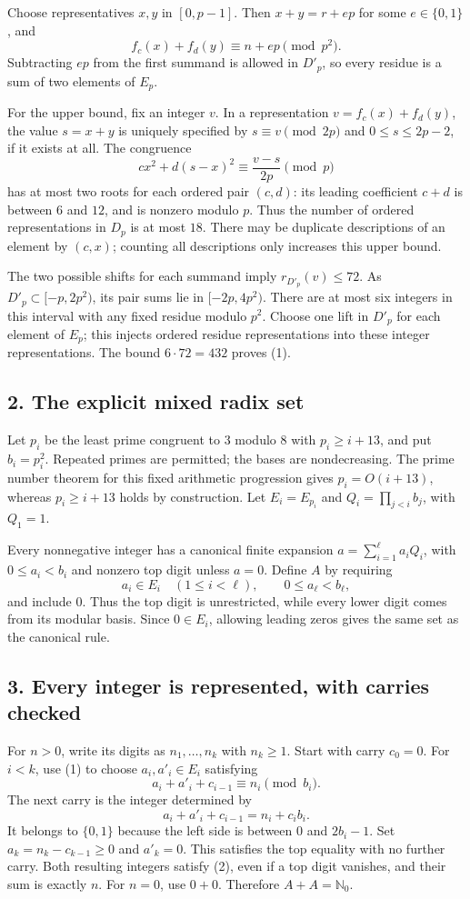 Choose representatives $x,y$ in $[0,p-1]$. Then $x+y=r+ep$ for some
$e\in\{0,1\}$, and
\[
 f_c(x)+f_d(y)\equiv n+ep\pmod{p^2}.
\]
Subtracting $ep$ from the first summand is allowed in $D'_p$, so every
residue is a sum of two elements of $E_p$.

For the upper bound, fix an integer $v$. In a representation
$v=f_c(x)+f_d(y)$, the value $s=x+y$ is uniquely specified by
$s\equiv v\pmod{2p}$ and $0\leq s\leq2p-2$, if it exists at all.
The congruence
\[
 cx^2+d(s-x)^2\equiv\frac{v-s}{2p}\pmod p
\]
has at most two roots for each ordered pair $(c,d)$: its leading
coefficient $c+d$ is between $6$ and $12$, and is nonzero modulo $p$.
Thus the number of ordered representations in $D_p$ is at most $18$.
There may be duplicate descriptions of an element by $(c,x)$; counting
all descriptions only increases this upper bound.

The two possible shifts for each summand imply $r_{D'_p}(v)\leq72$.
As $D'_p\subset[-p,2p^2)$, its pair sums lie in $[-2p,4p^2)$.
There are at most six integers in this interval with any fixed residue
modulo $p^2$. Choose one lift in $D'_p$ for each element of $E_p$;
this injects ordered residue representations into these integer
representations. The bound $6\cdot72=432$ proves (1).

\subsection{2. The explicit mixed radix set}
Let $p_i$ be the least prime congruent to $3$ modulo $8$ with
$p_i\geq i+13$, and put $b_i=p_i^2$. Repeated primes are permitted;
the bases are nondecreasing. The prime number theorem for this fixed
arithmetic progression gives $p_i=O(i+13)$, whereas $p_i\geq i+13$
holds by construction. Let $E_i=E_{p_i}$ and
$Q_i=\prod_{j<i}b_j$, with $Q_1=1$.

Every nonnegative integer has a canonical finite expansion
$a=\sum_{i=1}^{\ell}a_iQ_i$, with $0\leq a_i<b_i$ and nonzero top
digit unless $a=0$. Define $A$ by requiring
\[
 a_i\in E_i\quad(1\leq i<\ell),
 \qquad 0\leq a_\ell<b_\ell,                         \tag{2}
\]
and include $0$. Thus the top digit is unrestricted, while every lower
digit comes from its modular basis. Since $0\in E_i$, allowing leading
zeros gives the same set as the canonical rule.

\subsection{3. Every integer is represented, with carries checked}
For $n>0$, write its digits as $n_1,\ldots,n_k$ with $n_k\geq1$.
Start with carry $c_0=0$. For $i<k$, use (1) to choose
$a_i,a'_i\in E_i$ satisfying
\[
 a_i+a'_i+c_{i-1}\equiv n_i\pmod{b_i}.
\]
The next carry is the integer determined by
\[
 a_i+a'_i+c_{i-1}=n_i+c_i b_i.
\]
It belongs to $\{0,1\}$ because the left side is between $0$ and
$2b_i-1$. Set $a_k=n_k-c_{k-1}\geq0$ and $a'_k=0$.
This satisfies the top equality with no further carry. Both resulting
integers satisfy (2), even if a top digit vanishes, and their sum is
exactly $n$. For $n=0$, use $0+0$. Therefore $A+A=\mathbb N_0$.

